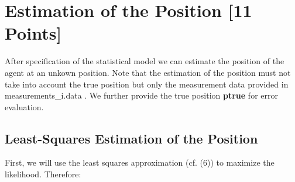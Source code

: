 \documentclass[a4paper]{article}
\begin{document}
\newpage

\section{Estimation of the Position [11 Points]}
After specification of the statistical model we can estimate the position of the agent at an unkown position. Note that the estimation of the position must not take into account the true position but only the measurement data provided in measurements\_i.data . We further provide the true position \textbf{ptrue} for error evaluation.

\subsection{Least-Squares Estimation of the Position}
First, we will use the least squares approximation (cf. (6)) to maximize the likelihood. Therefore:
\end{document}
